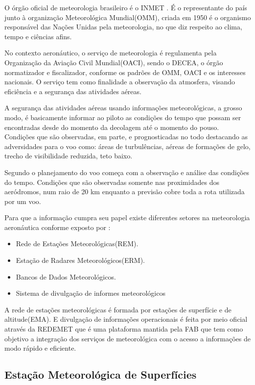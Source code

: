O órgão oficial de meteorologia brasileiro é o INMET \cite{oliveira2009inmet}. É o representante do país junto à organização Meteorológica Mundial(OMM), criada em 1950 é o organismo responsável das Nações Unidas pela meteorologia, no que diz respeito ao clima, tempo e ciências afins.

No contexto aeronáutico, o serviço de meteorologia é regulamenta pela Organização da Aviação Civil Mundial(OACI), sendo o DECEA, o órgão normatizador e fiscalizador, conforme os padrões de OMM, OACI e os interesses nacionais. O serviço tem como finalidade a observação da atmosfera, visando eficiência e a segurança das atividades aéreas.

A segurança das atividades aéreas usando informações meteorológicas, a grosso modo, é basicamente informar ao piloto as condições do tempo que possam ser encontradas desde do momento da decolagem até o momento do pouso. Condições que são observadas, em parte, e prognosticadas no todo destacando as adversidades para o voo como: áreas de turbulências, aéreas de formações de gelo, trecho de visibilidade reduzida, teto baixo. 

Segundo \cite{costa2008meteorologia} o planejamento do voo começa com a observação e análise das condições do tempo. Condições que são observadas somente nas proximidades dos aeródromos, num raio de 20 km enquanto a previsão cobre toda a rota utilizada por um voo.

Para que a informação cumpra seu papel existe diferentes setores na meteorologia aeronáutica conforme exposto por \cite{henrique2005meteorologia}:
\begin{itemize}
    \item Rede de Estações Meteorológicas(REM).
    \item Estação de Radares Meteorológicos(ERM).
    \item Bancos de Dados Meteorológicos.
    \item Sistema de divulgação de informes meteorológicos
\end{itemize}
    
A rede de estações meteorológicas é formada por estações de superfície e de altitude(EMA). E divulgação de informações operacionais é feita por meio oficial através da REDEMET \cite{redemet2020homepage} que é uma plataforma mantida pela FAB que tem como objetivo a integração dos serviços de meteorológica com o acesso a informações de modo rápido e eficiente.


\subsection{Estação Meteorológica de Superfícies}

